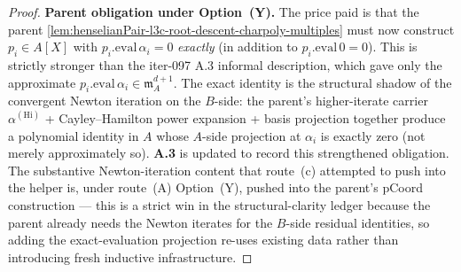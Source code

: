 \begin{proof}
\textbf{Parent obligation under Option~(Y).}
The price paid is that the parent
\cref{lem:henselianPair-l3c-root-descent-charpoly-multiples}
must now construct $p_i \in A[X]$ with $p_i.\mathrm{eval}\,
\alpha_i = 0$ \emph{exactly} (in addition to $p_i.\mathrm{eval}\,0
= 0$). This is strictly stronger than the iter-097 A.3 informal
description, which gave only the approximate
$p_i.\mathrm{eval}\,\alpha_i \in \mathfrak m_A^{d+1}$. The exact
identity is the structural shadow of the convergent Newton
iteration on the $B$-side: the parent's higher-iterate carrier
$\alpha^{(\mathrm{Hi})}$ + Cayley--Hamilton power expansion +
basis projection together produce a polynomial identity in $A$
whose $A$-side projection at $\alpha_i$ is exactly zero (not
merely approximately so). \textbf{A.3} is updated to record this
strengthened obligation. The substantive Newton-iteration content
that route~(c) attempted to push into the helper is, under
route~(A) Option~(Y), pushed into the parent's pCoord construction
— this is a strict win in the structural-clarity ledger
because the parent already needs the Newton iterates for the
$B$-side residual identities, so adding the exact-evaluation
projection re-uses existing data rather than introducing fresh
inductive infrastructure.


\end{proof}
